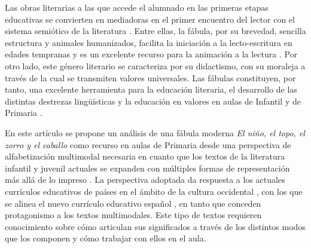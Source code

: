 \documentclass[spanish]{textolivre}
\begin{document}
Las obras literarias a las que accede el alumnado en las primeras etapas educativas se convierten en mediadoras en el primer encuentro del lector con el sistema semiótico de la literatura \cite{mendoza_fillola_funcion_1999}. Entre ellas, la fábula, por su brevedad, sencilla estructura y animales humanizados, facilita la iniciación a la lecto-escritura en edades tempranas y es un excelente recurso para la animación a la lectura \cite{carrascal_martin_fabula_2015}. Por otro lado, este género literario se caracteriza por su didactismo, con su moraleja a través de la cual se transmiten valores universales. Las fábulas constituyen, por tanto, una excelente herramienta para la educación literaria, el desarrollo de las distintas destrezas lingüísticas y la educación en valores en aulas de Infantil y de Primaria \cite{guijarro_zabalegui_valor_1998,montaner_bueno_seleccion_2013,rodriguez_fabula_2010,santana_henriquez_fabula_1993}.

En este artículo se propone un análisis de una fábula moderna \textit{El niño, el topo, el zorro y el caballo} \cite{mackesy_nino_2020} como recurso en aulas de Primaria desde una perspectiva de alfabetización multimodal necesaria en cuanto que los textos de la literatura infantil y juvenil actuales se expanden con múltiples formas de representación más allá de lo impreso \cite{hassett_theories_2009}. La perspectiva adoptada da respuesta a los actuales currículos educativos de países en el ámbito de la cultura occidental \cite{callow_talking_2003}, con los que se alinea el nuevo currículo educativo español  \cite{ministerio_de_educacion_y_formacion_profesional_real_2022}, en tanto que conceden protagonismo a los textos multimodales. Este tipo de textos requieren conocimiento sobre cómo articulan sus significados a través de los distintos modos que los componen y cómo trabajar con ellos en el aula.
\end{document}
